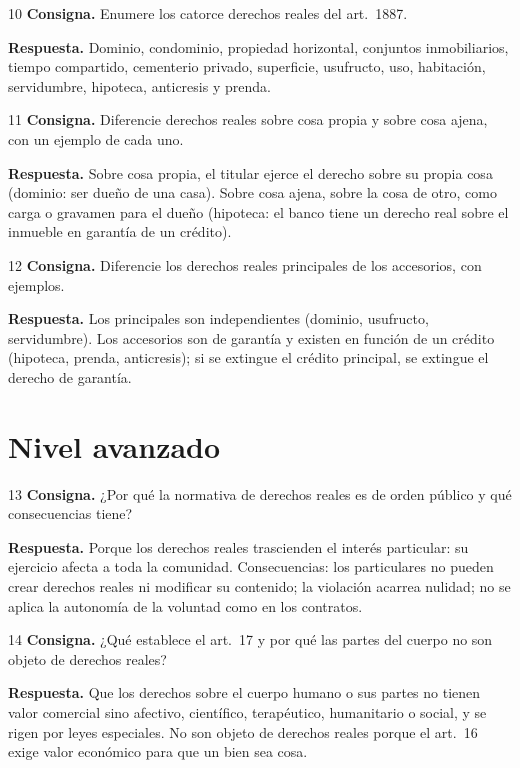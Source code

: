 \documentclass[12pt,oneside]{book}
\begin{document}
\begin{ejercicio}{10}
\textbf{Consigna.} Enumere los catorce derechos reales del art.~1887.

\textbf{Respuesta.} Dominio, condominio, propiedad horizontal, conjuntos inmobiliarios, tiempo compartido, cementerio privado, superficie, usufructo, uso, habitación, servidumbre, hipoteca, anticresis y prenda.
\end{ejercicio}

\begin{ejercicio}{11}
\textbf{Consigna.} Diferencie derechos reales sobre cosa propia y sobre cosa ajena, con un ejemplo de cada uno.

\textbf{Respuesta.} Sobre cosa propia, el titular ejerce el derecho sobre su propia cosa (dominio: ser dueño de una casa). Sobre cosa ajena, sobre la cosa de otro, como carga o gravamen para el dueño (hipoteca: el banco tiene un derecho real sobre el inmueble en garantía de un crédito).
\end{ejercicio}

\begin{ejercicio}{12}
\textbf{Consigna.} Diferencie los derechos reales principales de los accesorios, con ejemplos.

\textbf{Respuesta.} Los principales son independientes (dominio, usufructo, servidumbre). Los accesorios son de garantía y existen en función de un crédito (hipoteca, prenda, anticresis); si se extingue el crédito principal, se extingue el derecho de garantía.
\end{ejercicio}

\section{Nivel avanzado}

\begin{ejercicio}{13}
\textbf{Consigna.} ¿Por qué la normativa de derechos reales es de orden público y qué consecuencias tiene?

\textbf{Respuesta.} Porque los derechos reales trascienden el interés particular: su ejercicio afecta a toda la comunidad. Consecuencias: los particulares no pueden crear derechos reales ni modificar su contenido; la violación acarrea nulidad; no se aplica la autonomía de la voluntad como en los contratos.
\end{ejercicio}

\begin{ejercicio}{14}
\textbf{Consigna.} ¿Qué establece el art.~17 y por qué las partes del cuerpo no son objeto de derechos reales?

\textbf{Respuesta.} Que los derechos sobre el cuerpo humano o sus partes no tienen valor comercial sino afectivo, científico, terapéutico, humanitario o social, y se rigen por leyes especiales. No son objeto de derechos reales porque el art.~16 exige valor económico para que un bien sea cosa.
\end{ejercicio}
\end{document}
